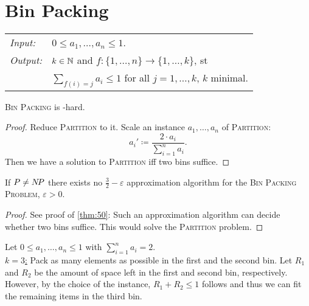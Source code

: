 \documentclass[../skript.tex]{subfiles}
\begin{document}
\chapter{Bin Packing} %
\begin{problem}
\begin{tabular}{@{}ll}
\textit{Input:} & $0 \leq a_1, \ldots, a_n \leq 1$. \\
\textit{Output:} & $k \in \mathbb{N}$ and $f : \{ 1, \ldots, n \} \to \{ 1, \ldots, k \}$, \ac{st} \\
& $\sum_{f(i) = j} a_i \leq 1$ for all $j = 1, \ldots, k$, $k$ minimal.
\end{tabular}
\end{problem}
\begin{theorem} %
\label{thm:50}
\textsc{Bin Packing} is \NP-hard.
\end{theorem}
\begin{proof}
Reduce \textsc{Partition} to it. Scale an instance $a_1, \ldots, a_n$ of \textsc{Partition}:
\[
	a_i' \coloneqq \frac{2 \cdot a_i}{\sum_{i=1}^n a_i}.
\]
Then we have a solution to \textsc{Partition} \ac{iff} two bins suffice.
\end{proof}
\begin{theorem} %
\label{thm:51}
If $P \neq N \! P$ there exists no $\frac{3}{2} - \varepsilon$ approximation algorithm for the \textsc{Bin Packing Problem}, $\varepsilon > 0$.
\end{theorem}
\begin{proof}
See proof of \cref{thm:50}: Such an approximation algorithm can decide whether two bins suffice. This would solve the \textsc{Partition} problem.
\end{proof}
Let $0 \leq a_1, \ldots, a_n \leq 1$ with $\sum_{i=1}^n a_i = 2$. \\
\underline{$k = 3$:} Pack as many elements as possible in the first and the second bin. Let $R_1$ and $R_2$ be the amount of space left in the first and second bin, respectively. However, by the choice of the instance, $R_1 + R_2 \leq 1$ follows and thus we can fit the remaining items in the third bin.
\end{document}
